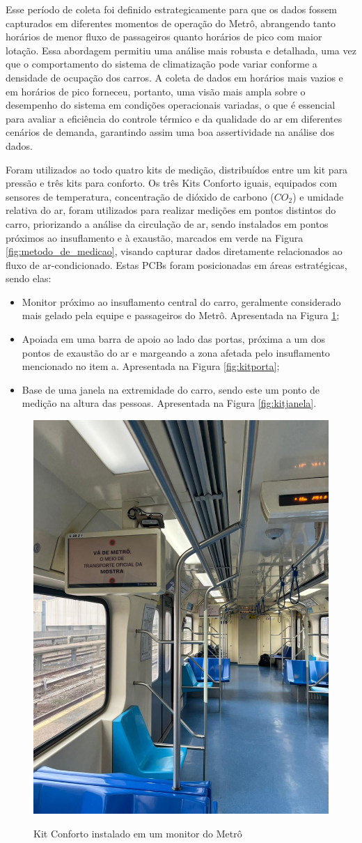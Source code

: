 \documentclass[acronym,symbols,table]{fei}
\begin{document}
Esse período de coleta foi definido estrategicamente para que os dados fossem capturados em diferentes momentos de operação do Metrô, abrangendo tanto horários de menor fluxo de passageiros quanto horários de pico com maior lotação. Essa abordagem permitiu uma análise mais robusta e detalhada, uma vez que o comportamento do sistema de climatização pode variar conforme a densidade de ocupação dos carros. A coleta de dados em horários mais vazios e em horários de pico forneceu, portanto, uma visão mais ampla sobre o desempenho do sistema em condições operacionais variadas, o que é essencial para avaliar a eficiência do controle térmico e da qualidade do ar em diferentes cenários de demanda, garantindo assim uma boa assertividade na análise dos dados.

Foram utilizados ao todo quatro kits de medição, distribuídos entre um kit para pressão e três kits para conforto. Os três Kits Conforto iguais, equipados com sensores de temperatura, concentração de dióxido de carbono (${CO}_{2}$) e umidade relativa do ar, foram utilizados para realizar medições em pontos distintos do carro, priorizando a análise da circulação de ar, sendo instalados em pontos próximos ao insuflamento e à exaustão, marcados em verde na Figura \ref{fig:metodo_de_medicao}, visando capturar dados diretamente relacionados ao fluxo de ar-condicionado. Estas PCBs foram posicionadas em áreas estratégicas, sendo elas:

\begin{itemize}[label=\arabic*.]
    \item Monitor próximo ao insuflamento central do carro, geralmente considerado mais gelado pela equipe e passageiros do Metrô. Apresentada na Figura \ref{fig:kittv};
    \item Apoiada em uma barra de apoio ao lado das portas, próxima a um dos pontos de exaustão do ar e margeando a zona afetada pelo insuflamento mencionado no item a. Apresentada na Figura \ref{fig:kitporta};
    \item Base de uma janela na extremidade do carro, sendo este um ponto de medição na altura das pessoas. Apresentada na Figura \ref{fig:kitjanela}.
\end{itemize}

\begin{figure}[!htb]
\centering
    \caption{Kit Conforto instalado em um monitor do Metrô}
    \includegraphics[width=0.39\linewidth]{Imagens/kittv.jpeg}
    \label{fig:kittv}
\end{figure}
\end{document}
